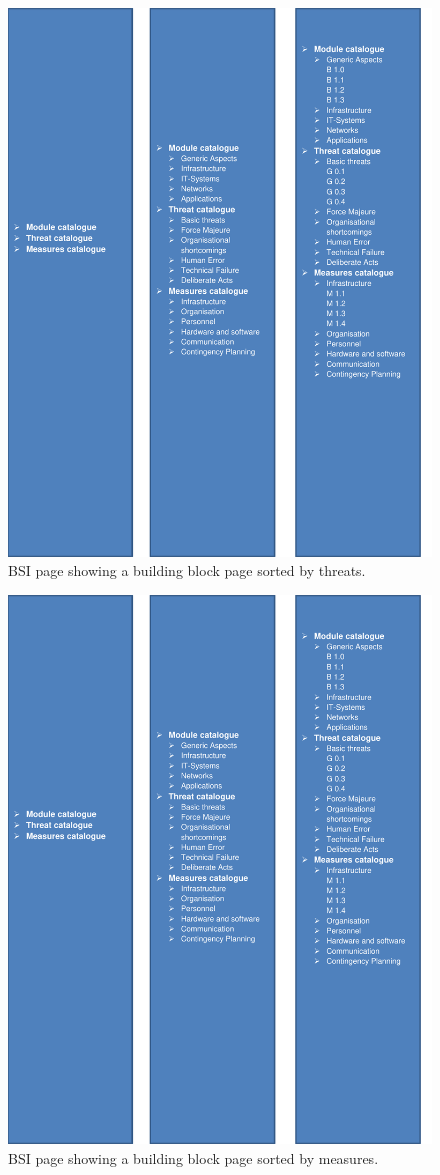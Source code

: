 \begin{figure}[h]  
    \centering
    \includegraphics[page=2,width=.8\textwidth]{Pictures/bsi_pages.pdf}
    \caption{BSI page showing a building block page sorted by threats.}
\end{figure}

\begin{figure}[h]  
    \centering
    \includegraphics[page=4,width=.8\textwidth]{Pictures/bsi_pages.pdf}
    \caption{BSI page showing a building block page sorted by measures.}
\end{figure}

